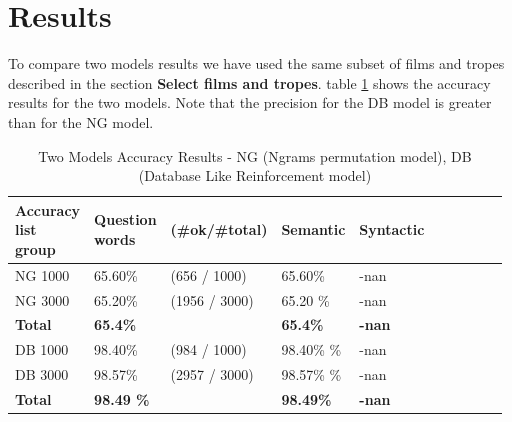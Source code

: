 \documentclass[letterpaper]{article}
\begin{document}
	
	
	\section{Results}
	\label{sec:res}
	
    To compare two models results we have used the same subset of films and tropes described in the section \textbf{Select films and tropes}. 
    table \ref{tab:two-models-accuracy-results} shows the accuracy results for the two models. Note that the precision for the DB model is greater than for the NG model.
	

\begin{table}[ht]
\centering
\begin{tabular}{|p{0.14\linewidth}|p{0.14\linewidth}|p{0.14\linewidth}|p{0.14\linewidth}|p{0.14\linewidth}|p{0.14\linewidth}|p{0.14\linewidth}|}
\hline
\textbf{Accuracy list group}& \textbf{Question words}  & \textbf{(\#ok/\#total)}& \textbf{Semantic} & \textbf{Syntactic}\\
\hline
\hline
NG 1000 & 65.60\% & (656 / 1000) & 65.60\% & -nan\\
\hline
NG 3000 & 65.20\% & (1956 / 3000) & 65.20 \% & -nan\\
\hline
\textbf{Total}& \textbf{65.4\% }&  & \textbf{65.4\% }&  \textbf{-nan }\\
\hline
\hline
DB 1000 & 98.40\% & (984 / 1000) &98.40\% \% & -nan\\
\hline
DB 3000 & 98.57\% & (2957 / 3000) & 98.57\% \% & -nan\\
\hline
\textbf{Total}& \textbf{98.49 \% }&  & \textbf{98.49\% }&  \textbf{-nan}\\
\hline

\end{tabular}
\caption{Two Models Accuracy Results - NG (Ngrams permutation model), DB (Database Like Reinforcement model)}
\label{tab:two-models-accuracy-results}
\end{table}
\end{document}
